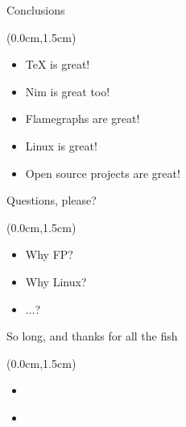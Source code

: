 \documentclass[xetex,14pt,aspectratio=169]{beamer}
\begin{document}
\begin{frame}{Conclusions}
\begin{textblock*}{\framewidth-0.8cm}(0.0cm,1.5cm) %
\begin{itemize}
  \item TeX is great!
  \item Nim is great too!
  \item Flamegraphs are great!
  \item Linux is great!
  \item Open source projects are great!
\end{itemize}
\end{textblock*}
\end{frame}

\begin{frame}{Questions, please?}
\begin{textblock*}{\framewidth-0.8cm}(0.0cm,1.5cm) %
\begin{itemize}
  \item Why FP?
  \item Why Linux?
  \item ...?
\end{itemize}
\end{textblock*}
\end{frame}

\begin{frame}{So long, and thanks for all the fish}
\begin{textblock*}{\framewidth-0.8cm}(0.0cm,1.5cm) %
\begin{itemize}
  \item \href{mailto:achistyakov@dataart.com}{\color{blue}{achistyakov@dataart.com}}
  \item \href{https://telegram.me/lhommequipleure}{\color{blue}{https://telegram.me/lhommequipleure}}
\end{itemize}
\end{textblock*}
\end{frame}
\end{document}

